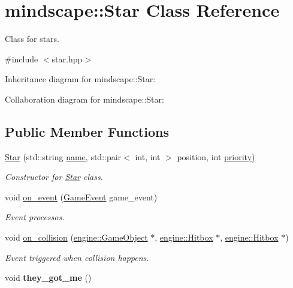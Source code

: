 \hypertarget{classmindscape_1_1_star}{}\section{mindscape\+:\+:Star Class Reference}
\label{classmindscape_1_1_star}


Class for stars.  




{\ttfamily \#include $<$star.\+hpp$>$}



Inheritance diagram for mindscape\+:\+:Star\+:


Collaboration diagram for mindscape\+:\+:Star\+:
\subsection*{Public Member Functions}
\begin{DoxyCompactItemize}
\item 
\hyperlink{classmindscape_1_1_star_ab783f62c3988243dd7f50eab2499c181}{Star} (std\+::string \hyperlink{classengine_1_1_game_object_a1f104f7af4f351e6d3278319762c9fe5}{name}, std\+::pair$<$ int, int $>$ position, int \hyperlink{classengine_1_1_game_object_a159ecaca30229e302793b11a75bd13c2}{priority})
\begin{DoxyCompactList}\small\item\em Constructor for \hyperlink{classmindscape_1_1_star}{Star} class. \end{DoxyCompactList}\item 
void \hyperlink{classmindscape_1_1_star_a6a9316e0d1ca0e8f2fb407d0c67b61ce}{on\+\_\+event} (\hyperlink{class_game_event}{Game\+Event} game\+\_\+event)
\begin{DoxyCompactList}\small\item\em Event processos. \end{DoxyCompactList}\item 
void \hyperlink{classmindscape_1_1_star_ad52e47751352be18a89aea676d3753c5}{on\+\_\+collision} (\hyperlink{classengine_1_1_game_object}{engine\+::\+Game\+Object} $\ast$, \hyperlink{classengine_1_1_hitbox}{engine\+::\+Hitbox} $\ast$, \hyperlink{classengine_1_1_hitbox}{engine\+::\+Hitbox} $\ast$)
\begin{DoxyCompactList}\small\item\em Event triggered when collision happens. \end{DoxyCompactList}\item 
void {\bfseries they\+\_\+got\+\_\+me} ()\hypertarget{classmindscape_1_1_star_a7d9082a463089da7be60a85a33b57538}{}\label{classmindscape_1_1_star_a7d9082a463089da7be60a85a33b57538}

\end{DoxyCompactItemize}
